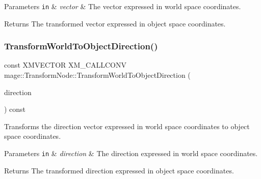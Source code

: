 \begin{DoxyParams}[1]{Parameters}
\mbox{\tt in}  & {\em vector} & The vector expressed in world space coordinates. \\
\hline
\end{DoxyParams}
\begin{DoxyReturn}{Returns}
The transformed vector expressed in object space coordinates. 
\end{DoxyReturn}
\hypertarget{classmage_1_1_transform_node_aac30202006ee4ccc2b9e05adb145656b}{}\label{classmage_1_1_transform_node_aac30202006ee4ccc2b9e05adb145656b} 
\subsubsection{\texorpdfstring{Transform\+World\+To\+Object\+Direction()}{TransformWorldToObjectDirection()}}
{\footnotesize\ttfamily const X\+M\+V\+E\+C\+T\+OR X\+M\+\_\+\+C\+A\+L\+L\+C\+O\+NV mage\+::\+Transform\+Node\+::\+Transform\+World\+To\+Object\+Direction (\begin{DoxyParamCaption}\item[{F\+X\+M\+V\+E\+C\+T\+OR}]{direction }\end{DoxyParamCaption}) const\hspace{0.3cm}{\ttfamily [noexcept]}}

Transforms the direction vector expressed in world space coordinates to object space coordinates.


\begin{DoxyParams}[1]{Parameters}
\mbox{\tt in}  & {\em direction} & The direction expressed in world space coordinates. \\
\hline
\end{DoxyParams}
\begin{DoxyReturn}{Returns}
The transformed direction expressed in object space coordinates. 
\end{DoxyReturn}
\hypertarget{classmage_1_1_transform_node_a792410956cd6577f3f840341d152ca8a}{}\label{classmage_1_1_transform_node_a792410956cd6577f3f840341d152ca8a} 

